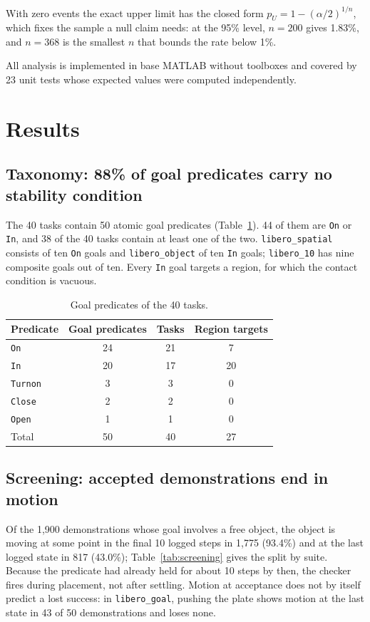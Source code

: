 \documentclass[10pt,twocolumn]{article}
\newcommand{\pred}[1]{\texttt{#1}}
\newcommand{\suite}[1]{\texttt{#1}}
\begin{document}
With zero events the exact upper limit has the closed form $p_U = 1-(\alpha/2)^{1/n}$, which fixes the sample a null claim needs: at the 95\% level, $n=200$ gives 1.83\%, and $n=368$ is the smallest $n$ that bounds the rate below 1\%.

All analysis is implemented in base MATLAB without toolboxes and covered by 23 unit tests whose expected values were computed independently.

\section{Results}
\label{sec:results}

\subsection{Taxonomy: 88\% of goal predicates carry no stability condition}
\label{sec:taxonomy}
The 40 tasks contain 50 atomic goal predicates (Table~\ref{tab:taxonomy}). 44 of them are \pred{On} or \pred{In}, and 38 of the 40 tasks contain at least one of the two. \suite{libero\_spatial} consists of ten \pred{On} goals and \suite{libero\_object} of ten \pred{In} goals; \suite{libero\_10} has nine composite goals out of ten. Every \pred{In} goal targets a region, for which the contact condition is vacuous.

\begin{table}[t]
\centering\small
\caption{Goal predicates of the 40 tasks.}
\label{tab:taxonomy}
\begin{tabular}{@{}lccc@{}}
\toprule
Predicate & Goal predicates & Tasks & Region targets \\
\midrule
\pred{On} & 24 & 21 & 7 \\
\pred{In} & 20 & 17 & 20 \\
\pred{Turnon} & 3 & 3 & 0 \\
\pred{Close} & 2 & 2 & 0 \\
\pred{Open} & 1 & 1 & 0 \\
\midrule
Total & 50 & 40 & 27 \\
\bottomrule
\end{tabular}
\end{table}

\subsection{Screening: accepted demonstrations end in motion}
Of the 1{,}900 demonstrations whose goal involves a free object, the object is moving at some point in the final 10 logged steps in 1{,}775 (93.4\%) and at the last logged state in 817 (43.0\%); Table~\ref{tab:screening} gives the split by suite. Because the predicate had already held for about 10 steps by then, the checker fires during placement, not after settling. Motion at acceptance does not by itself predict a lost success: in \suite{libero\_goal}, pushing the plate shows motion at the last state in 43 of 50 demonstrations and loses none.
\end{document}
